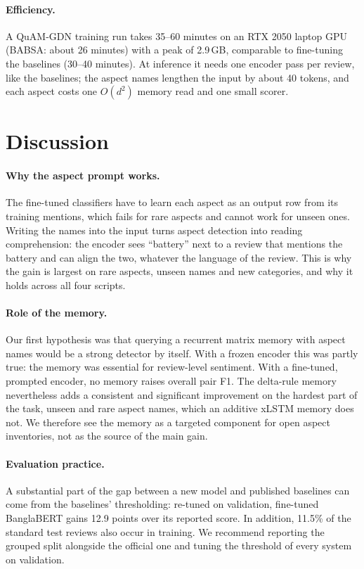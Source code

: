 \documentclass[11pt]{article}
\newcommand{\quam}{QuAM-GDN}
\begin{document}
\paragraph{Efficiency.}
A \quam{} training run takes 35--60 minutes on an RTX 2050 laptop GPU (BABSA: about 26 minutes) with a
peak of 2.9\,GB, comparable to fine-tuning the baselines (30--40 minutes). At inference it needs one
encoder pass per review, like the baselines; the aspect names lengthen the input by about 40 tokens,
and each aspect costs one $O(d^2)$ memory read and one small scorer.

\section{Discussion}
\label{sec:discussion}

\paragraph{Why the aspect prompt works.} The fine-tuned classifiers have to learn each aspect as an
output row from its training mentions, which fails for rare aspects and cannot work for unseen ones.
Writing the names into the input turns aspect detection into reading comprehension: the encoder sees
``battery'' next to a review that mentions the battery and can align the two, whatever the language of
the review. This is why the gain is largest on rare aspects, unseen names and new categories, and why
it holds across all four scripts.

\paragraph{Role of the memory.} Our first hypothesis was that querying a recurrent matrix memory with
aspect names would be a strong detector by itself. With a frozen encoder this was partly true: the
memory was essential for review-level sentiment. With a fine-tuned, prompted encoder, no memory raises
overall pair F1. The delta-rule memory nevertheless adds a consistent and significant improvement on
the hardest part of the task, unseen and rare aspect names, which an additive xLSTM memory does not.
We therefore see the memory as a targeted component for open aspect inventories, not as the source of
the main gain.

\paragraph{Evaluation practice.} A substantial part of the gap between a new model and published
baselines can come from the baselines' thresholding: re-tuned on validation, fine-tuned BanglaBERT
gains 12.9 points over its reported score. In addition, 11.5\% of the standard test reviews also occur
in training. We recommend reporting the grouped split alongside the official one and tuning the
threshold of every system on validation.
\end{document}
